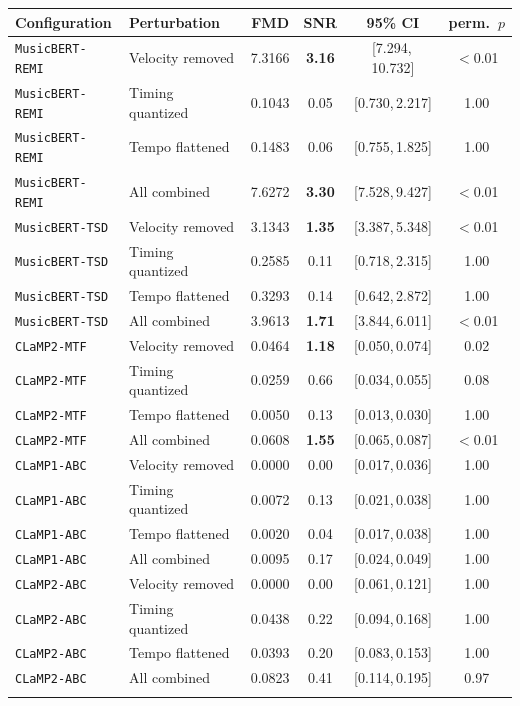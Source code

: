 \begin{tabular}{@{}llcccc@{}}
\toprule
Configuration & Perturbation & FMD & SNR & 95\% CI & perm.\ $p$ \\
\midrule
\texttt{MusicBERT-REMI} & Velocity removed & 7.3166 & \textbf{3.16} & [7.294,\,10.732] & $<$0.01 \\
\texttt{MusicBERT-REMI} & Timing quantized & 0.1043 & {0.05} & [0.730,\,2.217] & 1.00 \\
\texttt{MusicBERT-REMI} & Tempo flattened & 0.1483 & {0.06} & [0.755,\,1.825] & 1.00 \\
\texttt{MusicBERT-REMI} & All combined & 7.6272 & \textbf{3.30} & [7.528,\,9.427] & $<$0.01 \\
\addlinespace
\texttt{MusicBERT-TSD} & Velocity removed & 3.1343 & \textbf{1.35} & [3.387,\,5.348] & $<$0.01 \\
\texttt{MusicBERT-TSD} & Timing quantized & 0.2585 & {0.11} & [0.718,\,2.315] & 1.00 \\
\texttt{MusicBERT-TSD} & Tempo flattened & 0.3293 & {0.14} & [0.642,\,2.872] & 1.00 \\
\texttt{MusicBERT-TSD} & All combined & 3.9613 & \textbf{1.71} & [3.844,\,6.011] & $<$0.01 \\
\addlinespace
\texttt{CLaMP2-MTF} & Velocity removed & 0.0464 & \textbf{1.18} & [0.050,\,0.074] & 0.02 \\
\texttt{CLaMP2-MTF} & Timing quantized & 0.0259 & {0.66} & [0.034,\,0.055] & 0.08 \\
\texttt{CLaMP2-MTF} & Tempo flattened & 0.0050 & {0.13} & [0.013,\,0.030] & 1.00 \\
\texttt{CLaMP2-MTF} & All combined & 0.0608 & \textbf{1.55} & [0.065,\,0.087] & $<$0.01 \\
\addlinespace
\texttt{CLaMP1-ABC} & Velocity removed & 0.0000 & {0.00} & [0.017,\,0.036] & 1.00 \\
\texttt{CLaMP1-ABC} & Timing quantized & 0.0072 & {0.13} & [0.021,\,0.038] & 1.00 \\
\texttt{CLaMP1-ABC} & Tempo flattened & 0.0020 & {0.04} & [0.017,\,0.038] & 1.00 \\
\texttt{CLaMP1-ABC} & All combined & 0.0095 & {0.17} & [0.024,\,0.049] & 1.00 \\
\addlinespace
\texttt{CLaMP2-ABC} & Velocity removed & 0.0000 & {0.00} & [0.061,\,0.121] & 1.00 \\
\texttt{CLaMP2-ABC} & Timing quantized & 0.0438 & {0.22} & [0.094,\,0.168] & 1.00 \\
\texttt{CLaMP2-ABC} & Tempo flattened & 0.0393 & {0.20} & [0.083,\,0.153] & 1.00 \\
\texttt{CLaMP2-ABC} & All combined & 0.0823 & {0.41} & [0.114,\,0.195] & 0.97 \\
\addlinespace
\bottomrule
\end{tabular}